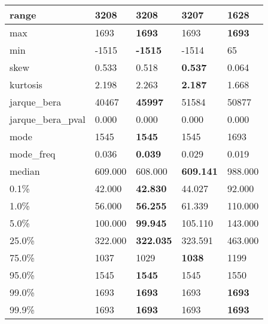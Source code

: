 \begin{table}[H]
\begin{tabular}{|l|m{10em}|m{10em}|m{10em}|m{10em}|}
\hline range & 3208 & \bfseries 3208 & 3207 & \cellcolor[rgb]{0.9, 0.54, 0.52} 1628 \\
\hline max & 1693 & \bfseries 1693 & \cellcolor[rgb]{0.9, 0.54, 0.52} 1693 & \bfseries 1693 \\
\hline min & -1515 & \bfseries -1515 & -1514 & \cellcolor[rgb]{0.9, 0.54, 0.52} 65 \\
\hline skew & 0.533 & 0.518 & \bfseries 0.537 & \cellcolor[rgb]{0.9, 0.54, 0.52} 0.064 \\
\hline kurtosis & 2.198 & 2.263 & \bfseries 2.187 & \cellcolor[rgb]{0.9, 0.54, 0.52} 1.668 \\
\hline jarque\_bera & 40467 & \bfseries 45997 & \cellcolor[rgb]{0.9, 0.54, 0.52} 51584 & 50877 \\
\hline jarque\_bera\_pval & 0.000 & 0.000 & 0.000 & 0.000 \\
\hline mode & 1545 & \bfseries 1545 & 1545 & \cellcolor[rgb]{0.9, 0.54, 0.52} 1693 \\
\hline mode\_freq & 0.036 & \bfseries 0.039 & 0.029 & \cellcolor[rgb]{0.9, 0.54, 0.52} 0.019 \\
\hline median & 609.000 & 608.000 & \bfseries 609.141 & \cellcolor[rgb]{0.9, 0.54, 0.52} 988.000 \\
\hline 0.1\% & 42.000 & \bfseries 42.830 & 44.027 & \cellcolor[rgb]{0.9, 0.54, 0.52} 92.000 \\
\hline 1.0\% & 56.000 & \bfseries 56.255 & 61.339 & \cellcolor[rgb]{0.9, 0.54, 0.52} 110.000 \\
\hline 5.0\% & 100.000 & \bfseries 99.945 & 105.110 & \cellcolor[rgb]{0.9, 0.54, 0.52} 143.000 \\
\hline 25.0\% & 322.000 & \bfseries 322.035 & 323.591 & \cellcolor[rgb]{0.9, 0.54, 0.52} 463.000 \\
\hline 75.0\% & 1037 & 1029 & \bfseries 1038 & \cellcolor[rgb]{0.9, 0.54, 0.52} 1199 \\
\hline 95.0\% & 1545 & \bfseries 1545 & 1545 & \cellcolor[rgb]{0.9, 0.54, 0.52} 1550 \\
\hline 99.0\% & 1693 & \bfseries 1693 & \cellcolor[rgb]{0.9, 0.54, 0.52} 1693 & \bfseries 1693 \\
\hline 99.9\% & 1693 & \bfseries 1693 & \cellcolor[rgb]{0.9, 0.54, 0.52} 1693 & \bfseries 1693 \\
\hline
\end{tabular}
\end{table}
